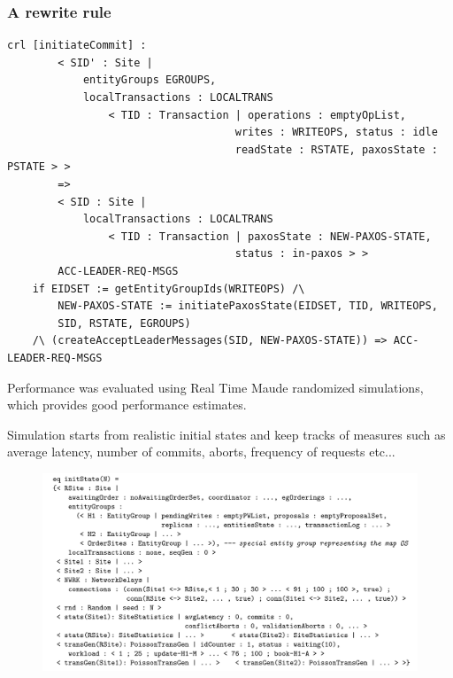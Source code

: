 \documentclass{beamer}
\begin{document}
\begin{frame}[fragile]
    \frametitle{A rewrite rule}
    \scriptsize
    \begin{lstlisting}[language=maude]
    crl [initiateCommit] :
        < SID' : Site |
            entityGroups EGROUPS,
            localTransactions : LOCALTRANS
                < TID : Transaction | operations : emptyOpList,
                                    writes : WRITEOPS, status : idle
                                    readState : RSTATE, paxosState : PSTATE > >
        =>
        < SID : Site |
            localTransactions : LOCALTRANS
                < TID : Transaction | paxosState : NEW-PAXOS-STATE,
                                    status : in-paxos > >
        ACC-LEADER-REQ-MSGS
    if EIDSET := getEntityGroupIds(WRITEOPS) /\
        NEW-PAXOS-STATE := initiatePaxosState(EIDSET, TID, WRITEOPS,
        SID, RSTATE, EGROUPS)
    /\ (createAcceptLeaderMessages(SID, NEW-PAXOS-STATE)) => ACC-LEADER-REQ-MSGS
        \end{lstlisting}
\end{frame}
\begin{frame}
    \scriptsize
    Performance was evaluated using Real Time Maude randomized simulations, which provides good performance estimates.

    
    \bigskip
    Simulation starts from realistic initial states and keep tracks of measures such as 
    average latency, number of commits, aborts, frequency of requests etc...
    \begin{figure}
        \includegraphics[width=\textwidth,height=\textheight,keepaspectratio]{img/init.png}
    \end{figure}
\end{frame}
\end{document}
